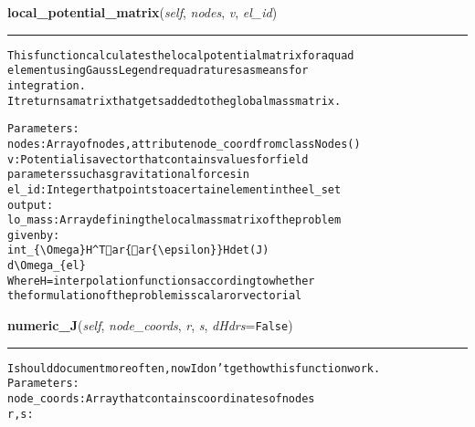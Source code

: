     \label{Classes:Quadrilaterals:local_potential_matrix}

    \vspace{0.5ex}

\hspace{.8\funcindent}\begin{boxedminipage}{\funcwidth}

    \raggedright \textbf{local\_potential\_matrix}(\textit{self}, \textit{nodes}, \textit{v}, \textit{el\_id})

    \vspace{-1.5ex}

    \rule{\textwidth}{0.5\fboxrule}
\setlength{\parskip}{2ex}
\begin{alltt}

This function calculates the local potential matrix for a quad
element using Gauss Legendre   quadratures as means for 
integration.
It returns a matrix that gets added to the global mass matrix.

Parameters:
    nodes:  Array of nodes, attribute node\_coord from class Nodes()
    v:     Potential is a vector that contains values for field 
           parameters such as gravitational forces in  
    el\_id: Integer that points to a certain element in the el\_set
output: 
    lo\_mass: Array defining the local mass matrix of the problem
            given by:
                int\_\{{\textbackslash}Omega\} H{\textasciicircum}T ar\{ar\{{\textbackslash}epsilon\}\} H det(J) 
                d {\textbackslash}Omega\_\{el\}
            Where H = interpolation functions according to whether
                      the formulation of the problem is scalar or vectorial
\end{alltt}

\setlength{\parskip}{1ex}
    \end{boxedminipage}

    \label{Classes:Quadrilaterals:numeric_J}

    \vspace{0.5ex}

\hspace{.8\funcindent}\begin{boxedminipage}{\funcwidth}

    \raggedright \textbf{numeric\_J}(\textit{self}, \textit{node\_coords}, \textit{r}, \textit{s}, \textit{dHdrs}={\tt False})

    \vspace{-1.5ex}

    \rule{\textwidth}{0.5\fboxrule}
\setlength{\parskip}{2ex}
\begin{alltt}
I should document more often, now I don't get how this            function work.
Parameters:
    node\_coords:    Array that contains coordinates of nodes
    r, s:   
\end{alltt}

\setlength{\parskip}{1ex}
    \end{boxedminipage}

